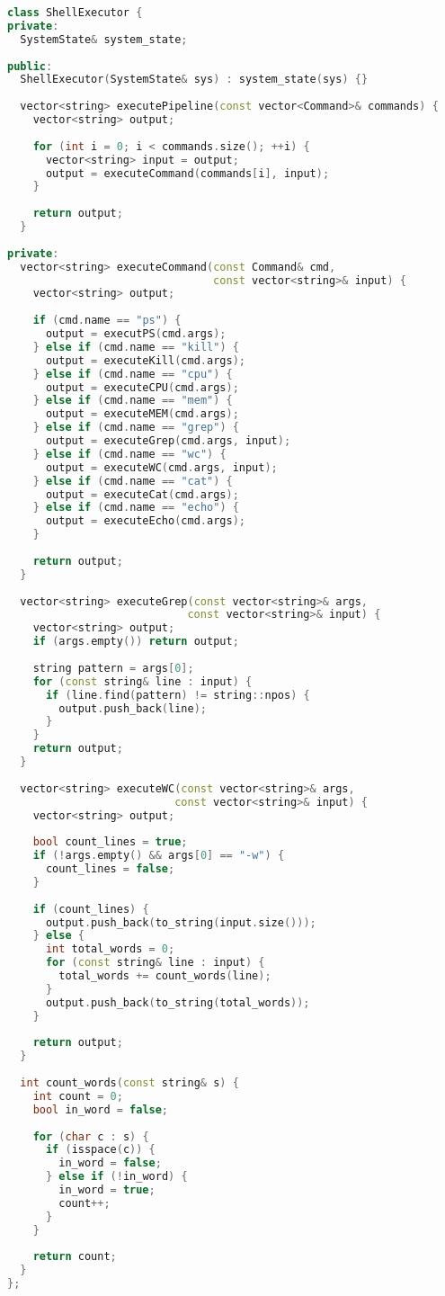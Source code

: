\begin{lstlisting}[language=C++,caption={Shell Executor}]
class ShellExecutor {
private:
  SystemState& system_state;
  
public:
  ShellExecutor(SystemState& sys) : system_state(sys) {}
  
  vector<string> executePipeline(const vector<Command>& commands) {
    vector<string> output;
    
    for (int i = 0; i < commands.size(); ++i) {
      vector<string> input = output;
      output = executeCommand(commands[i], input);
    }
    
    return output;
  }
  
private:
  vector<string> executeCommand(const Command& cmd, 
                                const vector<string>& input) {
    vector<string> output;
    
    if (cmd.name == "ps") {
      output = executPS(cmd.args);
    } else if (cmd.name == "kill") {
      output = executeKill(cmd.args);
    } else if (cmd.name == "cpu") {
      output = executeCPU(cmd.args);
    } else if (cmd.name == "mem") {
      output = executeMEM(cmd.args);
    } else if (cmd.name == "grep") {
      output = executeGrep(cmd.args, input);
    } else if (cmd.name == "wc") {
      output = executeWC(cmd.args, input);
    } else if (cmd.name == "cat") {
      output = executeCat(cmd.args);
    } else if (cmd.name == "echo") {
      output = executeEcho(cmd.args);
    }
    
    return output;
  }
  
  vector<string> executeGrep(const vector<string>& args, 
                            const vector<string>& input) {
    vector<string> output;
    if (args.empty()) return output;
    
    string pattern = args[0];
    for (const string& line : input) {
      if (line.find(pattern) != string::npos) {
        output.push_back(line);
      }
    }
    return output;
  }
  
  vector<string> executeWC(const vector<string>& args, 
                          const vector<string>& input) {
    vector<string> output;
    
    bool count_lines = true;
    if (!args.empty() && args[0] == "-w") {
      count_lines = false;
    }
    
    if (count_lines) {
      output.push_back(to_string(input.size()));
    } else {
      int total_words = 0;
      for (const string& line : input) {
        total_words += count_words(line);
      }
      output.push_back(to_string(total_words));
    }
    
    return output;
  }
  
  int count_words(const string& s) {
    int count = 0;
    bool in_word = false;
    
    for (char c : s) {
      if (isspace(c)) {
        in_word = false;
      } else if (!in_word) {
        in_word = true;
        count++;
      }
    }
    
    return count;
  }
};
\end{lstlisting}

